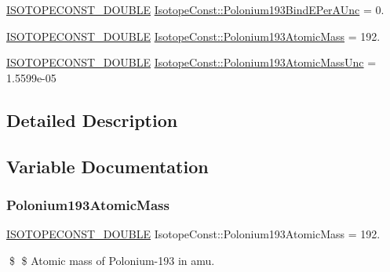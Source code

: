 \begin{DoxyCompactItemize}
\mbox{\hyperlink{group___isotope_const-_macros_ga8f45a7272ce02c0b4c65c44636ed719a}{I\+S\+O\+T\+O\+P\+E\+C\+O\+N\+S\+T\+\_\+\+D\+O\+U\+B\+LE}} \mbox{\hyperlink{group___isotope_const-_polonium-_po193_ga6602566d29a44f3bd49953f870cf38a8}{Isotope\+Const\+::\+Polonium193\+Bind\+E\+Per\+A\+Unc}} = 0.
\item 
\mbox{\hyperlink{group___isotope_const-_macros_ga8f45a7272ce02c0b4c65c44636ed719a}{I\+S\+O\+T\+O\+P\+E\+C\+O\+N\+S\+T\+\_\+\+D\+O\+U\+B\+LE}} \mbox{\hyperlink{group___isotope_const-_polonium-_po193_ga0f13755bd7e566f1e9e89cc67df2ea25}{Isotope\+Const\+::\+Polonium193\+Atomic\+Mass}} = 192.
\item 
\mbox{\hyperlink{group___isotope_const-_macros_ga8f45a7272ce02c0b4c65c44636ed719a}{I\+S\+O\+T\+O\+P\+E\+C\+O\+N\+S\+T\+\_\+\+D\+O\+U\+B\+LE}} \mbox{\hyperlink{group___isotope_const-_polonium-_po193_ga011f1c0871a3870d5af1ed57b51dd003}{Isotope\+Const\+::\+Polonium193\+Atomic\+Mass\+Unc}} = 1.\+5599e-\/05
\end{DoxyCompactItemize}


\subsection{Detailed Description}


\subsection{Variable Documentation}
\mbox{\label{group___isotope_const-_polonium-_po193_ga0f13755bd7e566f1e9e89cc67df2ea25}} 
\subsubsection{\texorpdfstring{Polonium193\+Atomic\+Mass}{Polonium193AtomicMass}}
{\footnotesize\ttfamily \mbox{\hyperlink{group___isotope_const-_macros_ga8f45a7272ce02c0b4c65c44636ed719a}{I\+S\+O\+T\+O\+P\+E\+C\+O\+N\+S\+T\+\_\+\+D\+O\+U\+B\+LE}} Isotope\+Const\+::\+Polonium193\+Atomic\+Mass = 192.}

\$ \$ Atomic mass of Polonium-\/193 in amu. \mbox{\label{group___isotope_const-_polonium-_po193_ga011f1c0871a3870d5af1ed57b51dd003}} 
